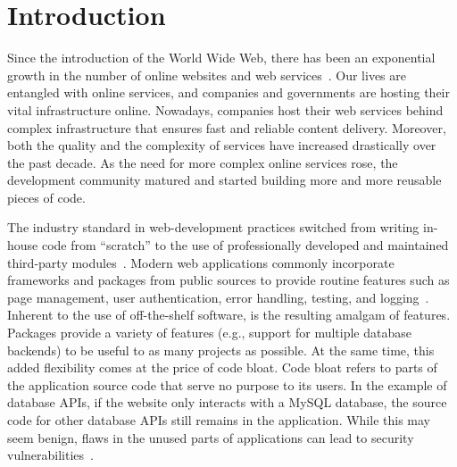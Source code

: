 \section{Introduction}

Since the introduction of the World Wide Web, there has been an exponential growth in the number of online websites and web services~\cite{websitestatistics}. 
Our lives are entangled with online services, and companies and governments are hosting their vital infrastructure online. 
Nowadays, companies host their web services behind complex infrastructure that ensures fast and reliable content delivery. 
Moreover, both the quality and the complexity of services have increased drastically over the past decade. 
As the need for more complex online services rose, the development community matured and started building more and more reusable pieces of code. 


The industry standard in web-development practices switched from writing in-house code from ``scratch'' to the use of professionally developed and maintained third-party modules~\cite{packagiststats, npmstatistics, pypi}. 
Modern web applications commonly incorporate frameworks and packages from public sources to provide routine features such as page management, user authentication, error handling, testing, and logging~\cite{popularphp}. 
Inherent to the use of off-the-shelf software, is the resulting amalgam of features. 
Packages provide a variety of features (e.g., support for multiple database backends) to be useful to as many projects as possible.
At the same time, this added flexibility comes at the price of code bloat. 
Code bloat refers to parts of the application source code that serve no purpose to its users. 
In the example of database APIs, if the website only interacts with a MySQL database, the source code for other database APIs still remains in the application. 
While this may seem benign, flaws in the unused parts of applications can lead to security vulnerabilities~\cite{lessismore, saphire}. 

